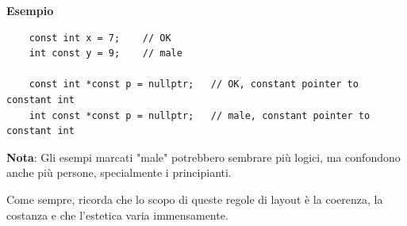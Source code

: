 \textsf{\small \textbf{Esempio}}

\begin{lstlisting}
	const int x = 7;    // OK
	int const y = 9;    // male
	
	const int *const p = nullptr;   // OK, constant pointer to constant int
	int const *const p = nullptr;   // male, constant pointer to constant int
\end{lstlisting}

\textsf{\small \textbf{Nota}: Gli esempi marcati "male" potrebbero sembrare più logici, ma confondono anche più persone, specialmente i principianti.} \break

\textsf{\small Come sempre, ricorda che lo scopo di queste regole di layout è la coerenza, la costanza e che l'estetica varia immensamente.} \\

